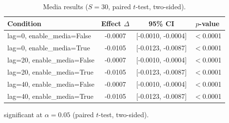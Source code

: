 \begin{table}[t]
  \centering
  \caption{Media results ($S=30$, paired $t$-test, two-sided).}
  \label{tab:media}
  \begin{tabular}{lccc}
    \toprule
    Condition & Effect $\Delta$ & 95\% CI & $p$-value \\
    \midrule
    lag=0, enable_media=False & -0.0007\dag{} & [-0.0010, -0.0004] & $<$0.0001 \\
    lag=0, enable_media=True & -0.0105\dag{} & [-0.0123, -0.0087] & $<$0.0001 \\
    lag=20, enable_media=False & -0.0007\dag{} & [-0.0010, -0.0004] & $<$0.0001 \\
    lag=20, enable_media=True & -0.0105\dag{} & [-0.0123, -0.0087] & $<$0.0001 \\
    lag=40, enable_media=False & -0.0007\dag{} & [-0.0010, -0.0004] & $<$0.0001 \\
    lag=40, enable_media=True & -0.0105\dag{} & [-0.0123, -0.0087] & $<$0.0001 \\
    \bottomrule
  \end{tabular}
  \begin{minipage}{\linewidth}
    \vspace{4pt}
    \footnotesize \dag{} significant at $\alpha = 0.05$ (paired $t$-test, two-sided).
  \end{minipage}
\end{table}